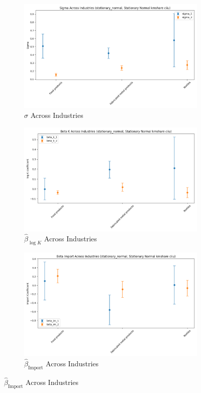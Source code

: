 \documentclass{article}
\begin{document}
\begin{figure}[ht!]
\begin{subfigure}[t]{0.32\textwidth}
        \includegraphics[width=\textwidth]{figure/stationary_normal_kmshare_ciiu_sigma_across_industries.png}
        \caption{$\hat\sigma$ Across Industries}
    \end{subfigure}
    \begin{subfigure}[t]{0.32\textwidth}
        \centering
        \includegraphics[width=\textwidth]{figure/stationary_normal_kmshare_ciiu_beta_k_across_industries.png}
        \caption{$\hat{\beta}_{\log K}$ Across Industries}
    \end{subfigure}
    \begin{subfigure}[t]{0.32\textwidth}
        \centering
        \includegraphics[width=\textwidth]{figure/stationary_normal_kmshare_ciiu_beta_im_across_industries.png}
        \caption{$\hat{\beta}_{\text{Import}}$ Across Industries}
    \end{subfigure}
\end{figure}
\end{document}
